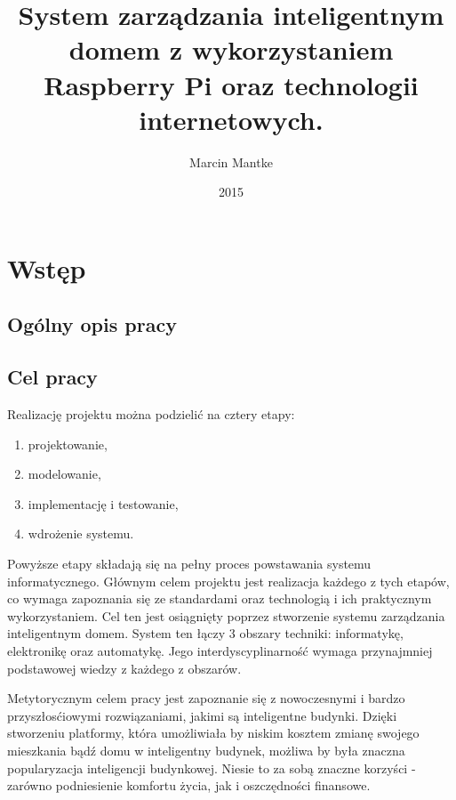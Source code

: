 \documentclass[eng,oneside]{mgr}
\author{Marcin Mantke}
\title{System zarządzania inteligentnym domem z wykorzystaniem Raspberry Pi oraz technologii internetowych.}
\date{2015}
\begin{document}
\maketitle
\tableofcontents
\chapter{Wstęp}
\section{Ogólny opis pracy}


\section{Cel pracy}
Realizację projektu można podzielić na cztery etapy:
\begin{enumerate}
	\item projektowanie,
	\item modelowanie,
	\item implementację i testowanie,
	\item wdrożenie systemu.
\end{enumerate}
Powyższe etapy składają się na pełny proces powstawania systemu informatycznego. Głównym celem projektu jest realizacja każdego z tych etapów, co wymaga zapoznania się ze standardami oraz technologią i ich praktycznym wykorzystaniem. Cel ten jest osiągnięty poprzez stworzenie systemu zarządzania inteligentnym domem. System ten łączy 3 obszary techniki: informatykę, elektronikę oraz automatykę. Jego interdyscyplinarność wymaga przynajmniej podstawowej wiedzy z każdego z obszarów.

Metytorycznym celem pracy jest zapoznanie się z nowoczesnymi i bardzo przyszłosćiowymi rozwiązaniami, jakimi są inteligentne budynki. Dzięki stworzeniu platformy, która umożliwiała by niskim kosztem zmianę swojego mieszkania bądź domu w inteligentny budynek, możliwa by była znaczna popularyzacja inteligencji budynkowej. Niesie to za sobą znaczne korzyści - zarówno podniesienie komfortu życia, jak i oszczędności finansowe.
\end{document}
